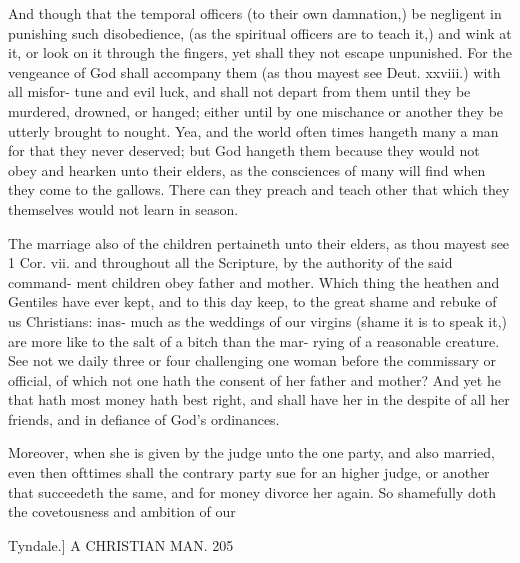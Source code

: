 \documentclass{custom}
\begin{document}
And though that the temporal officers (to their own 
damnation,) be negligent in punishing such disobedience, 
(as the spiritual officers are to teach it,) and wink at it, 
or look on it through the fingers, yet shall they not escape 
unpunished. For the vengeance of God shall accompany 
them (as thou mayest see Deut. xxviii.) with all misfor- 
tune and evil luck, and shall not depart from them until 
they be murdered, drowned, or hanged; either until by 
one mischance or another they be utterly brought to 
nought. Yea, and the world often times hangeth many a 
man for that they never deserved; but God hangeth them 
because they would not obey and hearken unto their 
elders, as the consciences of many will find when they 
come to the gallows. There can they preach and teach 
other that which they themselves would not learn in 
season. 

The marriage also of the children pertaineth unto their 
elders, as thou mayest see 1 Cor. vii. and throughout all 
the Scripture, by the authority of the said command- 
ment children obey father and mother. Which thing the 
heathen and Gentiles have ever kept, and to this day keep, 
to the great shame and rebuke of us Christians: inas- 
much as the weddings of our virgins (shame it is to speak 
it,) are more like to the salt of a bitch than the mar- 
rying of a reasonable creature. See not we daily three or 
four challenging one woman before the commissary or 
official, of which not one hath the consent of her father and 
mother? And yet he that hath most money hath best 
right, and shall have her in the despite of all her friends, 
and in defiance of God's ordinances. 

Moreover, when she is given by the judge unto the 
one party, and also married, even then ofttimes shall the 
contrary party sue for an higher judge, or another that 
succeedeth the same, and for money divorce her again. So 
shamefully doth the covetousness and ambition of our 


Tyndale.] A CHRISTIAN MAN. 205 
\end{document}
